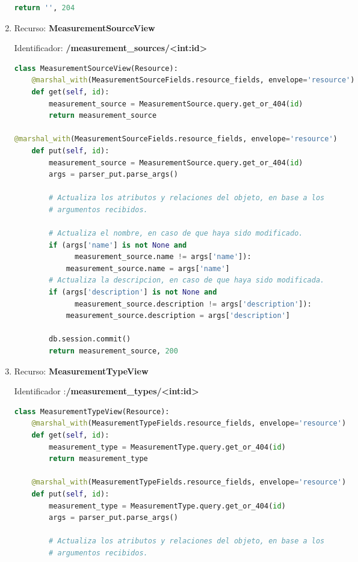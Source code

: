 \begin{enumerate}
\begin{lstlisting}[language=Python]
        return '', 204
\end{lstlisting}

\item Recurso: \textbf{MeasurementSourceView}

Identificador: \textbf{/measurement\_sources/<int:id>}

\begin{lstlisting}[language=Python]
class MeasurementSourceView(Resource):
    @marshal_with(MeasurementSourceFields.resource_fields, envelope='resource')
    def get(self, id):
        measurement_source = MeasurementSource.query.get_or_404(id)
        return measurement_source

@marshal_with(MeasurementSourceFields.resource_fields, envelope='resource')
    def put(self, id):
        measurement_source = MeasurementSource.query.get_or_404(id)
        args = parser_put.parse_args()

        # Actualiza los atributos y relaciones del objeto, en base a los
        # argumentos recibidos.

        # Actualiza el nombre, en caso de que haya sido modificado.
        if (args['name'] is not None and
              measurement_source.name != args['name']):
            measurement_source.name = args['name']
        # Actualiza la descripcion, en caso de que haya sido modificada.
        if (args['description'] is not None and
              measurement_source.description != args['description']):
            measurement_source.description = args['description']

        db.session.commit()
        return measurement_source, 200
\end{lstlisting}

\item Recurso: \textbf{MeasurementTypeView}

Identificador :\textbf{/measurement\_types/<int:id>}

\begin{lstlisting}[language=Python]
class MeasurementTypeView(Resource):
    @marshal_with(MeasurementTypeFields.resource_fields, envelope='resource')
    def get(self, id):
        measurement_type = MeasurementType.query.get_or_404(id)
        return measurement_type

    @marshal_with(MeasurementTypeFields.resource_fields, envelope='resource')
    def put(self, id):
        measurement_type = MeasurementType.query.get_or_404(id)
        args = parser_put.parse_args()

        # Actualiza los atributos y relaciones del objeto, en base a los
        # argumentos recibidos.


\end{lstlisting}
\end{enumerate}
